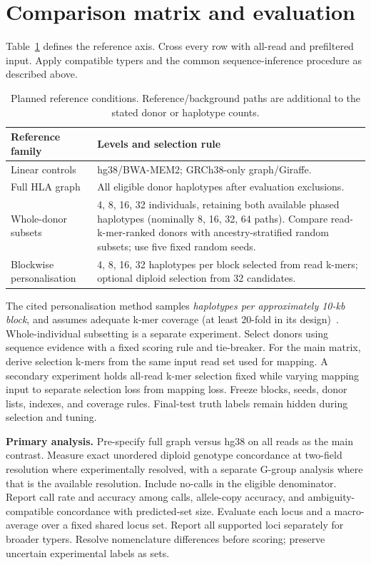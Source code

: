 \documentclass[10pt,a4paper]{article}
\begin{document}
\section{Comparison matrix and evaluation}
Table~\ref{tab:matrix} defines the reference axis. Cross every row with all-read
and prefiltered input. Apply compatible typers and the common sequence-inference
procedure as described above.
\begin{table}[ht]
\centering\small
\begin{tabularx}{\textwidth}{@{}lX@{}}
\toprule
Reference family & Levels and selection rule \\
\midrule
Linear controls & hg38/BWA-MEM2; GRCh38-only graph/Giraffe. \\
Full HLA graph & All eligible donor haplotypes after evaluation exclusions. \\
Whole-donor subsets & 4, 8, 16, 32 individuals, retaining both available phased
haplotypes (nominally 8, 16, 32, 64 paths). Compare read-k-mer-ranked donors with
ancestry-stratified random subsets; use five fixed random seeds. \\
Blockwise personalisation & 4, 8, 16, 32 haplotypes per block selected from read
k-mers; optional diploid selection from 32 candidates. \\
\bottomrule
\end{tabularx}
\caption{Planned reference conditions. Reference/background paths are additional
to the stated donor or haplotype counts.}\label{tab:matrix}
\end{table}
The cited personalisation method samples \emph{haplotypes per approximately
10-kb block}, and assumes adequate k-mer coverage (at least 20-fold in its
design)~\cite{personal}. Whole-individual subsetting is a separate experiment.
Select donors using sequence evidence with a fixed scoring rule and tie-breaker.
For the main matrix, derive selection k-mers from the same input read set used
for mapping. A secondary experiment holds all-read k-mer selection fixed while
varying mapping input to separate selection loss from mapping loss. Freeze
blocks, seeds, donor lists, indexes, and coverage rules. Final-test truth labels
remain hidden during selection and tuning.

\textbf{Primary analysis.}
Pre-specify full graph versus hg38 on all reads as the main contrast. Measure
exact unordered diploid genotype concordance at two-field resolution where
experimentally resolved, with a separate G-group analysis where that is the
available resolution. Include no-calls in the eligible denominator. Report
call rate and accuracy among calls, allele-copy accuracy, and ambiguity-compatible
concordance with predicted-set size. Evaluate each locus and a macro-average
over a fixed shared locus set. Report all supported loci separately for broader
typers. Resolve nomenclature differences before scoring; preserve uncertain
experimental labels as sets.
\end{document}
